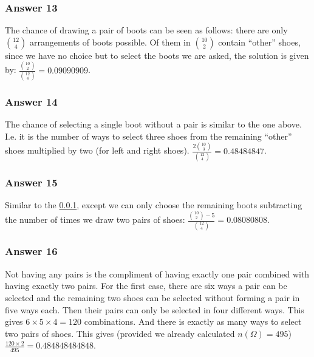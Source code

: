 \documentclass[11pt]{article}
\begin{document}
\subsubsection{Answer 13}
\label{sec-1-4-1}
The chance of drawing a pair of boots can be seen as follows: there are
only $\binom{12}{4}$ arrangements of boots possible.  Of them in 
$\binom{10}{2}$ contain ``other'' shoes, since we have no choice but to
select the boots we are asked, the solution is given by:
$\frac{\binom{10}{2}}{\binom{12}{4}} = \num{0.09090909}$.
\subsubsection{Answer 14}
\label{sec-1-4-2}
The chance of selecting a single boot without a pair is similar to the one
above. I.e. it is the number of ways to select three shoes from the remaining
``other'' shoes multiplied by two (for left and right shoes).
$\frac{2\binom{10}{3}}{\binom{12}{4}} = \num{0.48484847}$.
\subsubsection{Answer 15}
\label{sec-1-4-3}
Similar to the \ref{sec-1-4-1}, except we can only choose the remaining boots
subtracting the number of times we draw two pairs of shoes:
$\frac{\binom{10}{2} - 5}{\binom{12}{4}} = \num{0.08080808}$.
\subsubsection{Answer 16}
\label{sec-1-4-4}
Not having any pairs is the compliment of having exactly one pair 
combined with having exactly two pairs.  For the first case, there
are six ways a pair can be selected and the remaining two shoes can
be selected without forming a pair in five ways each.  Then their
pairs can only be selected in four different ways.  This gives
$6 \times 5 \times 4 = 120$ combinations.  And there is exactly
as many ways to select two pairs of shoes.  This gives (provided
we already calculated $n(\Omega) = 495$)
$\frac{120 \times 2}{495} = \num{0.484848484848}$.
\end{document}
